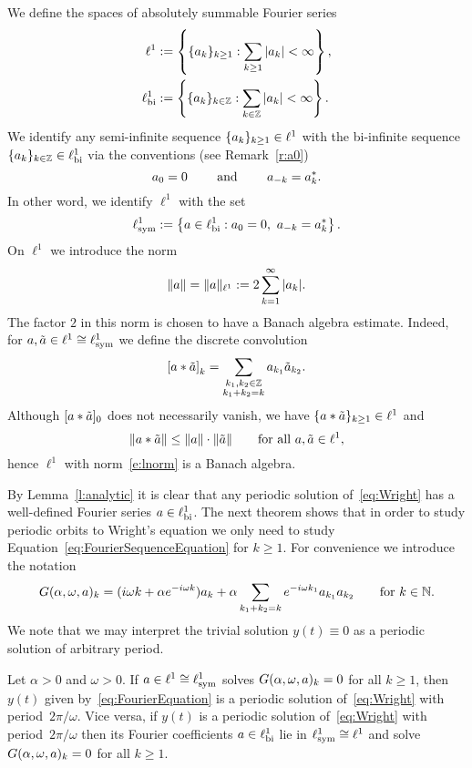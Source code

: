 %
We define the spaces of absolutely summable Fourier series
\begin{alignat*}{1}
	\ell^1 &:= \left\{ \{ a_k \}_{k \geq 1} : 
    \sum_{k \geq 1} | a_k| < \infty  \right\} , \\
	\ell^1_{\text{\textup{bi}}} &:= \left\{ \{ a_k \}_{k \in \mathbb{Z}} : 
    \sum_{k \in \mathbb{Z}} | a_k| < \infty  \right\} .
\end{alignat*} 
We identify any semi-infinite sequence $ \{ a_k \}_{k \geq 1} \in \ell^1$ with the bi-infinite sequence $ \{ a_k \}_{k \in \mathbb{Z}} \in \ell^1_{\text{\textup{bi}}}$ via the conventions (see Remark~\ref{r:a0})
\begin{equation}
  a_0=0 \qquad\text{ and }\qquad a_{-k} = a_{k}^*. 
\end{equation}
In other word, we identify $\ell^1$ with the set
\begin{equation*}
   \ell^1_{\text{\textup{sym}}} := \left\{ a \in \ell^1_{\text{\textup{bi}}} : 
	a_0=0,~a_{-k}=a_k^* \right\} .
\end{equation*}
On $\ell^1$ we introduce the norm
\begin{equation}\label{e:lnorm}
  \| a \| = \| a \|_{\ell^1} := 2 \sum_{k = 1}^\infty |a_k|.
\end{equation}
The factor $2$ in this norm is chosen to have a Banach algebra estimate.
Indeed, for $a, \tilde{a} \in \ell^1 \cong \ell^1_{\text{\textup{sym}}}$ we define
the discrete convolution 
\[
\left[ a * \tilde{a} \right]_k = \sum_{\substack{k_1,k_2\in\mathbb{Z}\\ k_1 + k_2 = k}} a_{k_1} \tilde{a}_{k_2} .
\]
Although $[a*\tilde{a}]_0$ does not necessarily vanish, we have $\{a*\tilde{a}\}_{k \geq 1} \in \ell^1 $ and 
\begin{equation*}
	\| a*\tilde{a} \| \leq \| a \| \cdot  \| \tilde{a} \| 
	\qquad\text{for all } a , \tilde{a} \in \ell^1, 
\end{equation*}
hence $\ell^1$ with norm~\eqref{e:lnorm} is a Banach algebra.

By Lemma~\ref{l:analytic} it is clear that any periodic solution of~\eqref{eq:Wright} has a well-defined Fourier series $a \in \ell^1_{\text{\textup{bi}}}$. 
The next theorem shows that in order to study periodic orbits to Wright's equation we only need to study Equation~\eqref{eq:FourierSequenceEquation} 
for $k \geq 1$. For convenience we introduce the notation 
\[
G(\alpha,\omega,a)_k=
( i \omega k + \alpha e^{ - i \omega k}) a_k + \alpha \sum_{k_1 + k_2 = k} e^{- i \omega k_1} a_{k_1} a_{k_2} \qquad \text{for } k \in \mathbb{N}.
\]
We note that we may interpret the trivial solution $y(t)\equiv 0$ as a periodic solution of arbitrary period.
\begin{theorem}
\label{thm:FourierEquivalence1}
Let $\alpha>0$ and $\omega>0$.
If $a \in \ell^1 \cong \ell^1_{\text{\textup{sym}}}$ solves
$G(\alpha,\omega,a)_k =0$  for all $k \geq 1$,
then $y(t)$ given by~\eqref{eq:FourierEquation} is a periodic solution of~\eqref{eq:Wright} with period~$2\pi/\omega$.
Vice versa, if $y(t)$ is a periodic solution of~\eqref{eq:Wright} with period~$2\pi/\omega$ then its Fourier coefficients $a \in \ell^1_{\text{\textup{bi}}}$ lie in $\ell^1_{\text{\textup{sym}}} \cong \ell^1$ and solve $G(\alpha,\omega,a)_k =0$ for all $k \geq 1$.
\end{theorem}

